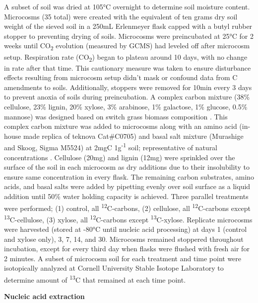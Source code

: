 A subset of soil was dried at 105°C overnight to determine soil moisture content. Microcosms (35 total) were created with the equivalent of ten grams dry soil weight of the sieved soil in a 250mL Erlenmeyer flask capped with a butyl rubber stopper to preventing drying of soils.  Microcosms were preincubated at 25°C for 2 weeks until CO\textsubscript{2} evolution (measured by GCMS) had leveled off after microcosm setup. Respiration rate (CO\textsubscript{2}) began to plateau around 10 days, with no change in rate after that time. This cautionary measure was taken to ensure disturbance effects resulting from microcosm setup didn't mask or confound data from C amendments to soils. Additionally, stoppers were removed for 10min every 3 days to prevent anoxia of soils during preincubation. A complex carbon mixture (38\% cellulose, 23\% lignin, 20\% xylose, 3\% arabinose, 1\% galactose, 1\% glucose, 0.5\% mannose) was designed based on switch grass biomass composition \cite{Yan_2010,David_2010}.  This complex carbon mixture was added to microcosms along with an amino acid (in-house made replica of teknova Cat#C0705) and basal salt mixture (Murashige and Skoog, Sigma M5524) at 2mgC 1g\textsuperscript{-1} soil; representative of natural concentrations \cite{Schneckenberger_2008}.  Cellulose (20mg) and lignin (12mg) were sprinkled over the surface of the soil in each microcosm as dry additions due to their insolubility to ensure same concentration in every flask. The remaining carbon substrates, amino acids, and basal salts were added by pipetting evenly over soil surface as a liquid addition until 50\% water holding capacity is achieved.  Three parallel treatments were performed; (1) control, all \textsuperscript{12}C-carbons, (2) cellulose, all \textsuperscript{12}C-carbons except \textsuperscript{13}C-cellulose, (3) xylose, all \textsuperscript{12}C-carbons except \textsuperscript{13}C-xylose.  Replicate microcosms were harvested (stored at -80°C until nucleic acid processing) at days 1 (control and xylose only), 3, 7, 14, and 30.  Microcosms remained stoppered throughout incubation, except for every third day when flasks were flushed with fresh air for 2 minutes.  A subset of microcosm soil for each treatment and time point were isotopically analyzed at Cornell University Stable Isotope Laboratory to determine amount of \textsuperscript{13}C that remained at each time point.                       



\textbf{Nucleic acid extraction}


